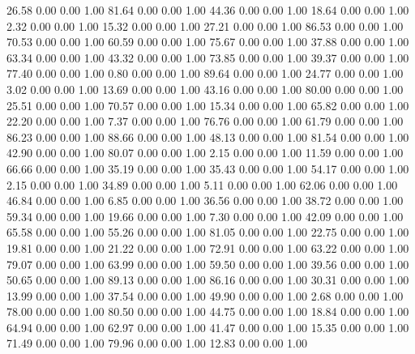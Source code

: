    26.58   0.00   0.00   1.00
   81.64   0.00   0.00   1.00
   44.36   0.00   0.00   1.00
   18.64   0.00   0.00   1.00
    2.32   0.00   0.00   1.00
   15.32   0.00   0.00   1.00
   27.21   0.00   0.00   1.00
   86.53   0.00   0.00   1.00
   70.53   0.00   0.00   1.00
   60.59   0.00   0.00   1.00
   75.67   0.00   0.00   1.00
   37.88   0.00   0.00   1.00
   63.34   0.00   0.00   1.00
   43.32   0.00   0.00   1.00
   73.85   0.00   0.00   1.00
   39.37   0.00   0.00   1.00
   77.40   0.00   0.00   1.00
    0.80   0.00   0.00   1.00
   89.64   0.00   0.00   1.00
   24.77   0.00   0.00   1.00
    3.02   0.00   0.00   1.00
   13.69   0.00   0.00   1.00
   43.16   0.00   0.00   1.00
   80.00   0.00   0.00   1.00
   25.51   0.00   0.00   1.00
   70.57   0.00   0.00   1.00
   15.34   0.00   0.00   1.00
   65.82   0.00   0.00   1.00
   22.20   0.00   0.00   1.00
    7.37   0.00   0.00   1.00
   76.76   0.00   0.00   1.00
   61.79   0.00   0.00   1.00
   86.23   0.00   0.00   1.00
   88.66   0.00   0.00   1.00
   48.13   0.00   0.00   1.00
   81.54   0.00   0.00   1.00
   42.90   0.00   0.00   1.00
   80.07   0.00   0.00   1.00
    2.15   0.00   0.00   1.00
   11.59   0.00   0.00   1.00
   66.66   0.00   0.00   1.00
   35.19   0.00   0.00   1.00
   35.43   0.00   0.00   1.00
   54.17   0.00   0.00   1.00
    2.15   0.00   0.00   1.00
   34.89   0.00   0.00   1.00
    5.11   0.00   0.00   1.00
   62.06   0.00   0.00   1.00
   46.84   0.00   0.00   1.00
    6.85   0.00   0.00   1.00
   36.56   0.00   0.00   1.00
   38.72   0.00   0.00   1.00
   59.34   0.00   0.00   1.00
   19.66   0.00   0.00   1.00
    7.30   0.00   0.00   1.00
   42.09   0.00   0.00   1.00
   65.58   0.00   0.00   1.00
   55.26   0.00   0.00   1.00
   81.05   0.00   0.00   1.00
   22.75   0.00   0.00   1.00
   19.81   0.00   0.00   1.00
   21.22   0.00   0.00   1.00
   72.91   0.00   0.00   1.00
   63.22   0.00   0.00   1.00
   79.07   0.00   0.00   1.00
   63.99   0.00   0.00   1.00
   59.50   0.00   0.00   1.00
   39.56   0.00   0.00   1.00
   50.65   0.00   0.00   1.00
   89.13   0.00   0.00   1.00
   86.16   0.00   0.00   1.00
   30.31   0.00   0.00   1.00
   13.99   0.00   0.00   1.00
   37.54   0.00   0.00   1.00
   49.90   0.00   0.00   1.00
    2.68   0.00   0.00   1.00
   78.00   0.00   0.00   1.00
   80.50   0.00   0.00   1.00
   44.75   0.00   0.00   1.00
   18.84   0.00   0.00   1.00
   64.94   0.00   0.00   1.00
   62.97   0.00   0.00   1.00
   41.47   0.00   0.00   1.00
   15.35   0.00   0.00   1.00
   71.49   0.00   0.00   1.00
   79.96   0.00   0.00   1.00
   12.83   0.00   0.00   1.00
